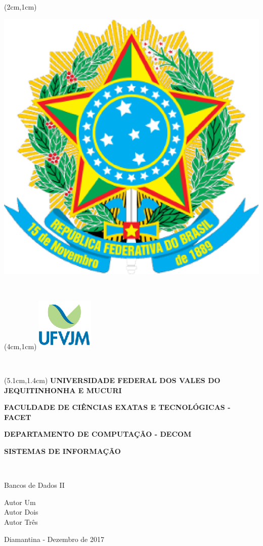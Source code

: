 \documentclass[12pt]{article}
\def\autores{Autor Um\\Autor Dois\\Autor Três}
\def\disciplina{Bancos de Dados II}
\def\universidade{Universidade Federal dos Vales do Jequitinhonha e Mucuri}
\def\faculdade{Faculdade de Ciências Exatas e Tecnológicas - FACET}
\def\departamento{Departamento de Computação - Decom}
\def\curso{Sistemas de Informação}
\def\cidade{Diamantina}
\begin{document}
\pagestyle{myheadings}
\newpage
{} 
\setcounter{page}{1}
\renewcommand{\thepage}{\arabic{page}}
\thispagestyle{empty}

\begin{center}
    \begin{textblock*}{\linewidth}(2cm,1cm)%
	    \raggedright
	    \includegraphics[width=0.17\linewidth]{../img/main/armas_brasil.eps}
    \end{textblock*} ~\\[1em]
	\begin{textblock*}{\linewidth}(4cm,1cm)%
		\raggedleft
		\includegraphics[width=0.17\linewidth]{../img/main/logo_ufvjm.eps}
	\end{textblock*} ~\\[1em]
	\begin{textblock*}{0.73\linewidth}(5.1cm,1.4cm)%
		\centering
			\bfseries\small\MakeUppercase{\universidade} \par
			\bfseries\scriptsize\MakeUppercase{\faculdade} \par
			\bfseries\scriptsize\MakeUppercase{\departamento} \par
			\bfseries\scriptsize\MakeUppercase{\curso} \par
	\end{textblock*} ~\\[1.5em]
\end{center}
\par %
\vfill
\vfill
\begin{center}
	\MakeUppercase\disciplina
\end{center}
\vfill
\vfill
\vfill
\begin{flushright}
	\autores
\end{flushright}
\vfill
\begin{center}
	\cidade{ }- Dezembro de 2017 
\end{center}
\clearpage
\end{document}
